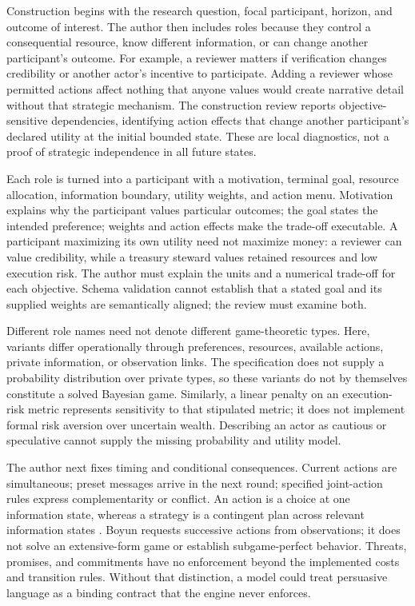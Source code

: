 Construction begins with the research question, focal participant, horizon,
and outcome of interest. The author then includes roles because they control
a consequential resource, know different information, or can change another
participant's outcome. For example, a reviewer matters if verification changes
credibility or another actor's incentive to participate. Adding a reviewer
whose permitted actions affect nothing that anyone values would create
narrative detail without that strategic mechanism. The construction review
reports objective-sensitive dependencies, identifying action effects that
change another participant's declared utility at the initial bounded state.
These are local diagnostics, not a proof of strategic independence in all
future states.

Each role is turned into a participant with a motivation, terminal goal,
resource allocation, information boundary, utility weights, and action menu.
Motivation explains why the participant values particular outcomes; the goal
states the intended preference; weights and action effects make the trade-off
executable. A participant maximizing its own utility need not maximize money:
a reviewer can value credibility, while a treasury steward values retained
resources and low execution risk. The author must explain the units and a
numerical trade-off for each objective. Schema validation cannot establish
that a stated goal and its supplied weights are semantically aligned; the
review must examine both.

Different role names need not denote different game-theoretic types. Here,
variants differ operationally through preferences, resources, available
actions, private information, or observation links. The specification does
not supply a probability distribution over private types, so these variants
do not by themselves constitute a solved Bayesian game. Similarly, a linear
penalty on an execution-risk metric represents sensitivity to that stipulated
metric; it does not implement formal risk aversion over uncertain wealth.
Describing an actor as cautious or speculative cannot supply the missing
probability and utility model.

The author next fixes timing and conditional consequences. Current actions
are simultaneous; preset messages arrive in the next round; specified
joint-action rules express complementarity or conflict. An action is a
choice at one information state, whereas a strategy is a contingent plan
across relevant information states \cite{polak15,polak18}. Boyun requests
successive actions from observations; it does not solve an extensive-form
game or establish subgame-perfect behavior. Threats, promises, and commitments
have no enforcement beyond the implemented costs and transition rules.
Without that distinction, a model could treat persuasive language as a binding
contract that the engine never enforces.


